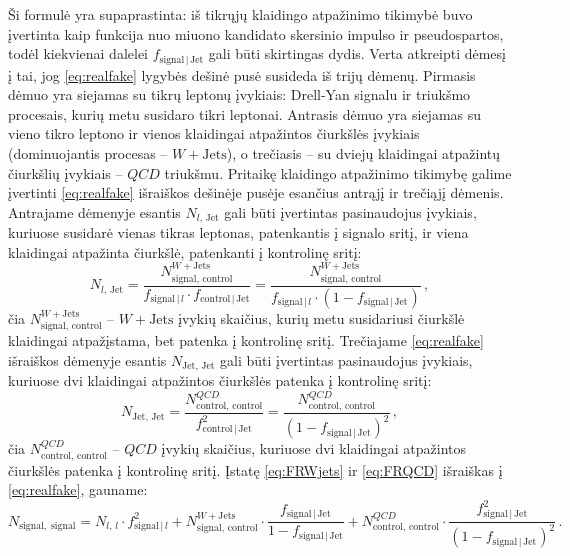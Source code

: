 \documentclass[a4paper, 12pt, oneside]{article}
\newcommand{\WJets}{W\! +\!\mathrm{Jets}}
\newcommand{\QCD}{QC\! D}
\newlength\q
\begin{document}
Ši formulė yra supaprastinta: iš tikrųjų klaidingo atpažinimo tikimybė buvo įvertinta kaip funkcija nuo miuono kandidato
skersinio impulso ir pseudospartos, todėl kiekvienai dalelei $f_{\mathrm{signal} \,| \,\mathrm{Jet}}$  gali būti skirtingas dydis.
Verta atkreipti dėmesį į tai, jog \eqref{eq:realfake} lygybės dešinė pusė susideda iš trijų dėmenų.
Pirmasis dėmuo yra siejamas su tikrų leptonų įvykiais: Drell-Yan signalu ir triukšmo procesais, kurių metu susidaro tikri leptonai.
Antrasis dėmuo yra siejamas su vieno tikro leptono ir vienos klaidingai atpažintos čiurkšlės įvykiais
(dominuojantis procesas -- $\WJets$), o trečiasis -- su dviejų klaidingai atpažintų čiurkšlių įvykiais -- $\QCD$ triukšmu.
Pritaikę klaidingo atpažinimo tikimybę galime įvertinti \eqref{eq:realfake} išraiškos dešinėje pusėje esančius antrąjį ir trečiąjį dėmenis.
Antrajame dėmenyje esantis $N_{l, \, \mathrm{Jet}}$ gali būti įvertintas pasinaudojus įvykiais, kuriuose susidarė vienas tikras
leptonas, patenkantis į signalo sritį, ir viena klaidingai atpažinta čiurkšlė, patenkanti į kontrolinę sritį:
\begin{equation}
	\label{eq:FRWjets}
	N_{l, \, \mathrm{Jet}} = \frac{N^{\WJets}_{\mathrm{signal, \, control}}}
	{f_{\mathrm{signal} \,| \, l}\cdot f_{\mathrm{control} \,| \, \mathrm{Jet}}} =
	\frac{N^{\WJets}_{\mathrm{signal, \, control}}}
	{f_{\mathrm{signal} \,| \, l}\cdot \left( 1 - f_{\mathrm{signal} \,| \, \mathrm{Jet}} \right)}	\, ,
\end{equation}
čia $N^{\WJets}_{\mathrm{signal, \, control}}$ -- $\WJets$ įvykių skaičius, kurių metu susidariusi čiurkšlė
klaidingai atpažįstama, bet patenka į kontrolinę sritį.
Trečiajame \eqref{eq:realfake} išraiškos dėmenyje esantis $N_{\mathrm{Jet, \, Jet}}$ gali būti įvertintas pasinaudojus įvykiais,
kuriuose dvi klaidingai atpažintos čiurkšlės patenka į kontrolinę sritį:
\begin{equation}
	\label{eq:FRQCD}
	N_{\mathrm{Jet, \, Jet}} = \frac{N^{\QCD}_{\mathrm{control, \, control}}}{f^2_{\mathrm{control} \,| \,\mathrm{Jet}}} =
	\frac{N^{\QCD}_{\mathrm{control, \, control}}}{\left(1-f_{\mathrm{signal} \,| \,\mathrm{Jet}}\right)^2} \, ,
\end{equation}
čia $N^{\QCD}_{\mathrm{control, \, control}}$ -- $\QCD$ įvykių skaičius, kuriuose dvi klaidingai atpažintos čiurkšlės patenka į
kontrolinę sritį.
Įstatę \eqref{eq:FRWjets} ir \eqref{eq:FRQCD} išraiškas į \eqref{eq:realfake}, gauname:
\begin{equation}
	\label{eq:FRapply}
	N_{\mathrm{signal, \; signal}} = N_{l, \, l} \cdot f^2_{\mathrm{signal} \,| \,l} +
	N^{\WJets}_{\mathrm{signal, \, control}} \cdot
	\frac{f_{\mathrm{signal} \,| \, \mathrm{Jet}}} {1 - f_{\mathrm{signal} \,| \, \mathrm{Jet}}} + 
	N^{\QCD}_{\mathrm{control, \, control}} \cdot
	\frac{f^2_{\mathrm{signal} \,| \,\mathrm{Jet}}}
	{\left(1-f_{\mathrm{signal} \,| \,\mathrm{Jet}} \right)^2}\, .
\end{equation}
\end{document}
